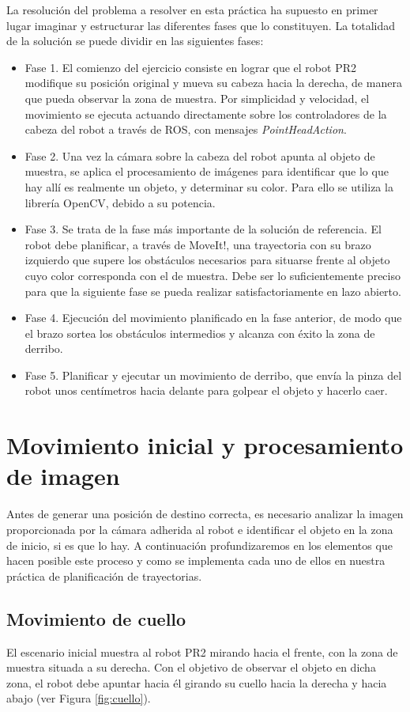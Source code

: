 \documentclass[12pt,spanish,chapterprefix, numbers=noenddot]{book}
\numberwithin{equation}{section}
\numberwithin{figure}{section}
\begin{document}
La resolución del problema a resolver en esta práctica ha supuesto en primer lugar imaginar y estructurar las diferentes fases que lo constituyen. La totalidad de la solución se puede dividir en las siguientes fases: 
\begin{itemize}
    \item Fase 1. El comienzo del ejercicio consiste en lograr que el robot PR2 modifique su posición original y mueva su cabeza hacia la derecha, de manera que pueda observar la zona de muestra. Por simplicidad y velocidad, el movimiento se ejecuta actuando directamente sobre los controladores de la cabeza del robot a través de ROS, con mensajes \textit{PointHeadAction}.
    \item Fase 2. Una vez la cámara sobre la cabeza del robot apunta al objeto de muestra, se aplica el procesamiento de imágenes para identificar que lo que hay allí es realmente un objeto, y determinar su color. Para ello se utiliza la librería OpenCV, debido a su potencia. 
    \item Fase 3. Se trata de la fase más importante de la solución de referencia. El robot debe planificar, a través de MoveIt!, una trayectoria con su brazo izquierdo que supere los obstáculos necesarios para situarse frente al objeto cuyo color corresponda con el de muestra. Debe ser lo suficientemente preciso para que la siguiente fase se pueda realizar satisfactoriamente en lazo abierto. 
    \item Fase 4. Ejecución del movimiento planificado en la fase anterior, de modo que el brazo sortea los obstáculos intermedios y alcanza con éxito la zona de derribo.  
    \item Fase 5. Planificar y ejecutar un movimiento de derribo, que envía la pinza del robot unos centímetros hacia delante para golpear el objeto y hacerlo caer. 
\end{itemize}


\section{Movimiento inicial y procesamiento de imagen}
Antes de generar una posición de destino correcta, es necesario analizar la imagen proporcionada por la cámara adherida al robot  e identificar el objeto en la zona de inicio, si es que lo hay. 
A continuación profundizaremos en los elementos que hacen posible este proceso y como se implementa cada uno de ellos en nuestra práctica de planificación de trayectorias. 

\subsection{Movimiento de cuello}
El escenario inicial muestra al robot PR2 mirando hacia el frente, con la zona de muestra situada a su derecha. Con el objetivo de observar el objeto en dicha zona, el robot debe apuntar hacia él girando su cuello hacia la derecha y hacia abajo (ver Figura \ref{fig:cuello}).
\end{document}
